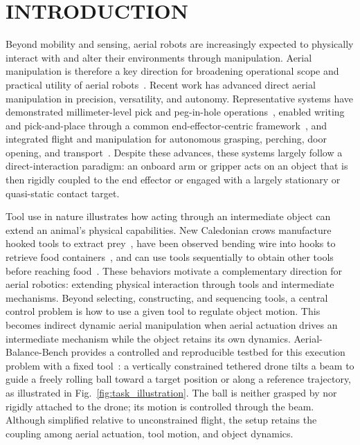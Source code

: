 \documentclass[letterpaper, 10 pt, conference]{ieeeconf}  %
\begin{document}
\section{INTRODUCTION}
Beyond mobility and sensing, aerial robots are increasingly expected to physically interact with and alter 
their environments through manipulation. Aerial manipulation is therefore a key  direction for broadening 
operational scope and practical utility of aerial robots~\cite{ollero2022past}. Recent work has advanced direct
aerial manipulation in precision, versatility, and autonomy. Representative systems have demonstrated
millimeter-level pick and peg-in-hole operations~\cite{wang2024millimeter}, enabled writing and pick-and-place
through a common end-effector-centric framework~\cite{he2025flyingHand}, and integrated flight and manipulation
for autonomous grasping, perching, door opening, and transport~\cite{wu2026handLike}. Despite these advances,
these systems largely follow a direct-interaction paradigm: an onboard arm or gripper acts on an object that is
then rigidly coupled to the end effector or engaged with a largely stationary or quasi-static contact target.

Tool use in nature illustrates how acting through an intermediate object can extend an animal's
physical capabilities. New Caledonian crows manufacture hooked tools to extract prey~\cite{hunt1996manufacture},
have been observed bending wire into hooks to retrieve food containers~\cite{weir2002shaping},
and can use tools sequentially to obtain other tools before reaching food~\cite{wimpenny2009cognitive}.
These behaviors motivate a complementary direction for aerial robotics: extending physical interaction
through tools and intermediate mechanisms. Beyond selecting, constructing, and sequencing tools,
a central control problem is how to use a given tool to regulate object motion. This becomes
indirect dynamic aerial manipulation when aerial actuation drives an intermediate mechanism
while the object retains its own dynamics. Aerial-Balance-Bench provides a controlled and reproducible
testbed for this execution problem with a fixed tool~\cite{liu2026aerialBalanceBench}: a vertically
constrained tethered drone tilts a beam to guide a freely rolling ball toward a target position
or along a reference trajectory, as illustrated in Fig.~\ref{fig:task_illustration}.
The ball is neither grasped by nor rigidly attached to the drone;
its motion is controlled through the beam. Although simplified relative to unconstrained flight,
the setup retains the coupling among aerial actuation, tool motion, and object dynamics.
\end{document}
